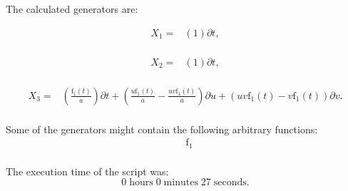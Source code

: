 \noindent The calculated generators are:

\begin{align*}
X_{1}=&\left(1 \right)\partial t,\\
\end{align*}

\begin{align*}
X_{2}=&\left(1 \right)\partial t,\\
\end{align*}

\begin{align*}
X_{3}=&\left(\frac{\operatorname{f_{1}}{\left(t \right)}}{a} \right)\partial t+\left(\frac{u \operatorname{f_{1}}{\left(t \right)}}{a}- \frac{u v \operatorname{f_{1}}{\left(t \right)}}{a} \right)\partial u+\left(u v \operatorname{f_{1}}{\left(t \right)} - v \operatorname{f_{1}}{\left(t \right)} \right)\partial v.\\
\end{align*}



\noindent Some of the generators might contain the following arbitrary functions:
\begin{align*}
&\operatorname{f_{1}}\\
\end{align*}

\noindent The execution time of the script was:
$$0\;\mathrm{hours}\;0\;\mathrm{minutes}\;27 \;\mathrm{seconds}.$$
